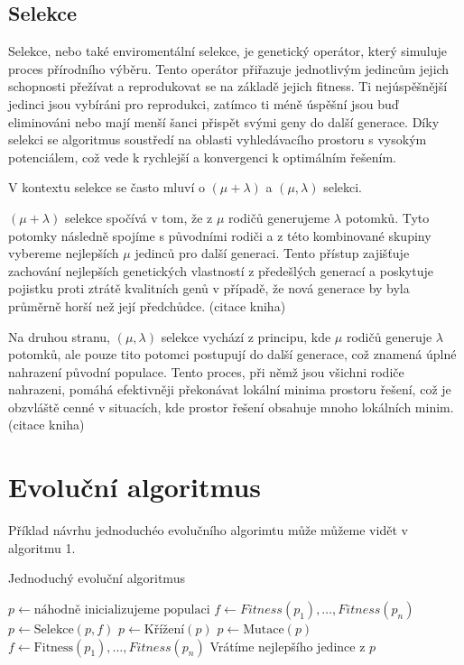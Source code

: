 \subsection{Selekce}
Selekce, nebo také enviromentální selekce, je genetický operátor, který simuluje proces přírodního výběru. Tento operátor přiřazuje jednotlivým jedincům jejich schopnosti přežívat a reprodukovat se na základě jejich fitness. Ti nejúspěšnější jedinci jsou vybíráni pro reprodukci, zatímco ti méně úspěšní jsou buď eliminováni nebo mají menší šanci přispět svými geny do další generace. Díky selekci se algoritmus soustředí na oblasti vyhledávacího prostoru s vysokým potenciálem, což vede k rychlejší a konvergenci k optimálním řešením. 

V kontextu selekce se často mluví o $(\mu + \lambda)$ a $(\mu, \lambda)$ selekci. 

$(\mu + \lambda)$ selekce spočívá v tom, že z $\mu$ rodičů generujeme $\lambda$ potomků. Tyto potomky následně spojíme s původními rodiči a z této kombinované skupiny vybereme nejlepších $\mu$ jedinců pro další generaci. Tento přístup zajišťuje zachování nejlepších genetických vlastností z předešlých generací a poskytuje pojistku proti ztrátě kvalitních genů v případě, že nová generace by byla průměrně horší než její předchůdce. (citace kniha)

Na druhou stranu, $(\mu, \lambda)$ selekce vychází z principu, kde $\mu$ rodičů generuje $\lambda$ potomků, ale pouze tito potomci postupují do další generace, což znamená úplné nahrazení původní populace. Tento proces, při němž jsou všichni rodiče nahrazeni, pomáhá efektivněji překonávat lokální minima prostoru řešení, což je obzvláště cenné v situacích, kde prostor řešení obsahuje mnoho lokálních minim. (citace kniha)

\section{Evoluční algoritmus}

Příklad návrhu jednoduchéo evolučního algorimtu může můžeme vidět v algoritmu 1.

\begin{algorithm}
\caption{Jednoduchý evoluční algoritmus}
\begin{algorithmic}[1]  %
	\State $p \gets \mbox{náhodně inicializujeme populaci}$
    \State $f \gets Fitness(p_1), \dots, Fitness(p_n)$ 
		\State $p \gets \mbox{Selekce}(p, f)$
		\State $p \gets \mbox{Křížení}(p)$
		\State $p \gets \mbox{Mutace}(p)$
        \State $f \gets \mbox{Fitness}(p_1), \dots, Fitness(p_n)$
    \EndWhile
    \State Vrátíme nejlepšího jedince z $p$
\EndFunction
\end{algorithmic}
\end{algorithm}




